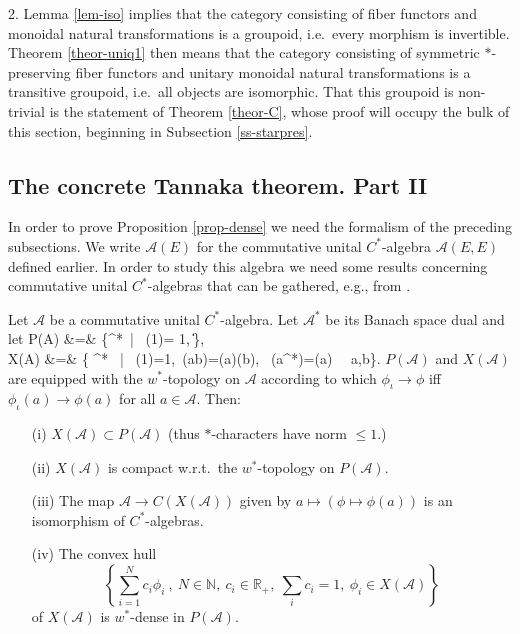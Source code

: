 \documentclass[11pt]{article}
\theoremstyle{definition}
\theoremstyle{definition}
\theoremstyle{remark}
\def\2#1{{\mathcal #1}}
\def\7#1{{\mathbb #1}}
\def\ol#1{{\overline #1}}
\newcommand{\rarr}{\rightarrow}
\newcounter{bean}
\begin{document}
2. Lemma \ref{lem-iso} implies that the category consisting of fiber functors and monoidal natural 
transformations is a groupoid, i.e.\ every morphism is invertible. Theorem \ref{theor-uniq1} then
means that the category consisting of symmetric $*$-preserving fiber functors and unitary monoidal
natural transformations is a transitive groupoid, i.e.\ all objects are isomorphic. That this
groupoid is non-trivial is the statement of Theorem \ref{theor-C}, whose proof will occupy the bulk
of this section, beginning in Subsection \ref{ss-starpres}. 
\erem





\subsection{The concrete Tannaka theorem. Part II} \label{ss-concrete2}
In order to prove Proposition \ref{prop-dense} we need the formalism of the preceding subsections. 
 We write $\2A(E)$ for the commutative unital $C^*$-algebra $\2A(E,E)$ defined earlier. In order to
study this algebra we need some results concerning commutative unital $C^*$-algebras that can be
gathered, e.g., from \cite{ped}.

\btheor \label{theor-cstar}
Let $\2A$ be a commutative unital $C^*$-algebra. Let $\2A^*$ be its Banach space dual and let
\bean P(\2A) &=& \{\phi\in\2A^*\ | \ \phi(1)= 1,\ \|\phi\|\}, \\
   X(\2A) &=& \{ \phi\in\2A^* \ | \ \phi(1)=1,\ \phi(ab)=\phi(a)\phi(b), \ \phi(a^*)=\ol{\phi(a)}
  \ \ \forall a,b\in\2A\}. 
\eean
$P(\2A)$ and $X(\2A)$ are equipped with the $w^*$-topology on $\2A$ according to which
$\phi_\iota\rightarrow\phi$ iff $\phi_\iota(a)\rightarrow\phi(a)$ for all $a\in\2A$. Then:
\begin{itemize}
\item[(i)] $X(\2A)\subset P(\2A)$  (thus $*$-characters have norm $\le 1$.)
\item[(ii)] $X(\2A)$ is compact w.r.t.\ the $w^*$-topology on $P(\2A)$.
\item[(iii)] The map $\2A\rarr C(X(\2A))$ given by $a\mapsto (\phi\mapsto\phi(a))$ is an isomorphism of
  $C^*$-algebras.
\item[(iv)] The convex hull
\[ \left\{ \sum_{i=1}^N c_i \phi_i \ , \ N\in\7N, \ c_i\in\7R_+, \ \sum_ic_i=1, \ \phi_i\in X(\2A) \right\} \]
of $X(\2A)$ is $w^*$-dense in $P(\2A)$.
\end{itemize}
\etheor
\end{document}
